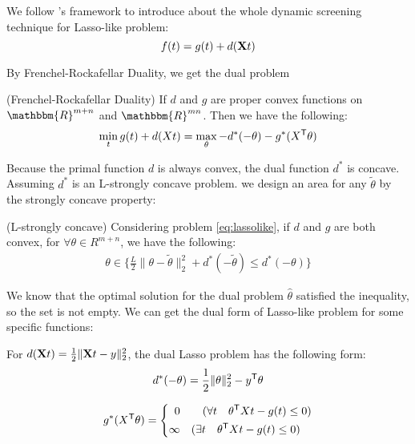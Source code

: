 We follow \cite{NEURIPS2021_7b5b23f4}'s framework to introduce about the whole dynamic screening technique for Lasso-like problem:
\begin{equation}
\label{eq:lassolike}
f(t) = g(t) + d(\mathbf{X} t)
\end{equation}

By Frenchel-Rockafellar Duality, we get the dual problem
\begin{thm}
 (Frenchel-Rockafellar Duality) If $d$ and $g$ are proper convex functions on $\mathbbm{R}^{m+n}$ and $\mathbbm{R}^{mn}$. Then we have the following:
 $$
\begin{aligned}
\min_t  g(t) + d(Xt) = \max_{\theta} -d^*(-\theta)-g^*(X^{\mathsf T}\theta)
\end{aligned}
$$
\end{thm}

Because the primal function $d$ is always convex, the dual function $d^*$ is concave. Assuming $d^*$ is an L-strongly concave problem. we design an area for any $\tilde{\theta}$ by the strongly concave property:

\begin{thm}\label{circle}
(L-strongly concave) Considering problem \ref{eq:lassolike}, if $d$ and $g$ are both convex, for $\forall \theta \in{R^{m+n}}$, we have the following:  
$$
\begin{aligned}
\theta \in \{\frac{L}{2}\|\theta-\tilde{\theta}\|_2^2+d^*(-\tilde{\theta}) \leq d^*(-\theta)\}
\end{aligned}
$$
\end{thm}
We know that the optimal solution for the dual problem $\hat{\theta}$ satisfied the inequality, so the set is not empty.
We can get the dual form of Lasso-like problem for some specific functions: 
\begin{lem}
For $d(\mathbf{X} t) = \frac{1}{2}\|\mathbf{X} t-y\|_2^2$, the dual Lasso problem has the following form:
$$
\begin{aligned}
d^*(-\theta) = \frac{1}{2}\|\theta\|_2^2-y^{\mathsf T}\theta
\end{aligned}
$$

$$
g^*(X^{\mathsf T}\theta) = \left\{
\begin{aligned}
0 \quad&\quad ( \forall t \quad\theta^{\mathsf T}Xt - g(t) \leq 0 )\\
\infty \quad&( \exists t \quad\theta^{\mathsf T}Xt - g(t) \leq 0 )
\end{aligned}
\right.
$$
\end{lem}





















